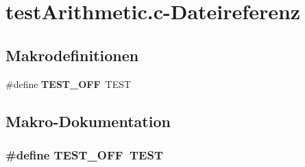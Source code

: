 \section{testArithmetic.c-\/Dateireferenz}
\label{test_arithmetic_8c}
\subsection*{Makrodefinitionen}
\begin{DoxyCompactItemize}
\item 
\#define {\bf TEST\_\-OFF}~TEST
\end{DoxyCompactItemize}


\subsection{Makro-\/Dokumentation}
\subsubsection[{TEST\_\-OFF}]{\setlength{\rightskip}{0pt plus 5cm}\#define TEST\_\-OFF~TEST}\label{test_arithmetic_8c_a8f6764e8e57eabbb14922404c0e25175}
